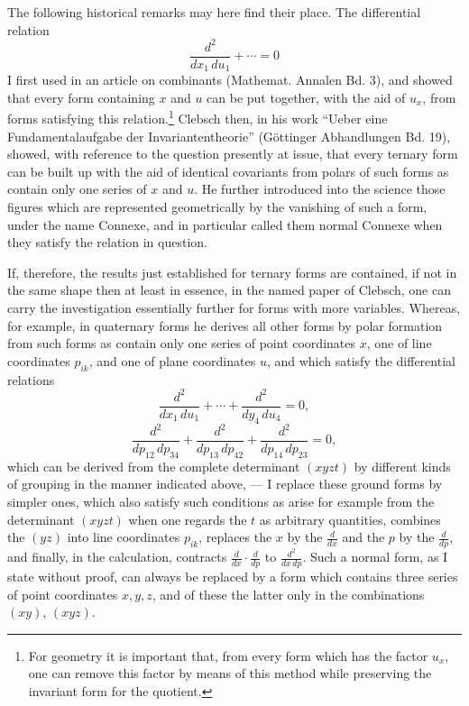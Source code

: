\documentclass[10pt]{article}
\begin{document}
The following historical remarks may here find their place. The differential relation
\[
\frac{d^2}{dx_1\,du_1}+\cdots=0
\]
I first used in an article on combinants (Mathemat. Annalen Bd. 3), and showed that every form containing $x$ and $u$ can be put together, with the aid of $u_x$, from forms satisfying this relation.\footnote{For geometry it is important that, from every form which has the factor $u_x$, one can remove this factor by means of this method while preserving the invariant form for the quotient.} Clebsch then, in his work ``Ueber eine Fundamentalaufgabe der Invariantentheorie'' (Göttinger Abhandlungen Bd. 19), showed, with reference to the question presently at issue, that every ternary form can be built up with the aid of identical covariants from polars of such forms as contain only one series of $x$ and $u$. He further introduced into the science those figures which are represented geometrically by the vanishing of such a form, under the name Connexe, and in particular called them normal Connexe when they satisfy the relation in question.

If, therefore, the results just established for ternary forms are contained, if not in the same shape then at least in essence, in the named paper of Clebsch, one can carry the investigation essentially further for forms with more variables. Whereas, for example, in quaternary forms he derives all other forms by polar formation from such forms as contain only one series of point coordinates $x$, one of line coordinates $p_{ik}$, and one of plane coordinates $u$, and which satisfy the differential relations
\[
\frac{d^2}{dx_1\,du_1}+\cdots+\frac{d^2}{dy_4\,du_4}=0,
\]
\[
\frac{d^2}{dp_{12}\,dp_{34}}+
\frac{d^2}{dp_{13}\,dp_{42}}+
\frac{d^2}{dp_{14}\,dp_{23}}=0,
\]
which can be derived from the complete determinant $(xyzt)$ by different kinds of grouping in the manner indicated above, --- I replace these ground forms by simpler ones, which also satisfy such conditions as arise for example from the determinant $(xyzt)$ when one regards the $t$ as arbitrary quantities, combines the $(yz)$ into line coordinates $p_{ik}$, replaces the $x$ by the $\frac d{dx}$ and the $p$ by the $\frac d{dp}$, and finally, in the calculation, contracts $\frac d{dx}\cdot\frac d{dp}$ to $\frac{d^2}{dx\,dp}$. Such a normal form, as I state without proof, can always be replaced by a form which contains three series of point coordinates $x,y,z$, and of these the latter only in the combinations $(xy)$, $(xyz)$.
\end{document}
